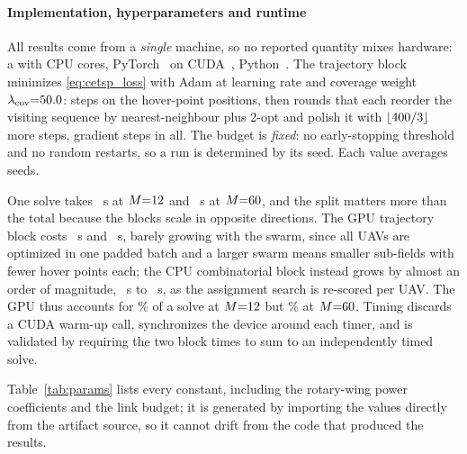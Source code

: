 \paragraph*{Implementation, hyperparameters and runtime}
All results come from a \emph{single} machine, so no reported quantity mixes
hardware: a \rEnvGpu{} with \rEnvCores{} CPU cores, PyTorch~\rEnvTorch{} on
CUDA~\rEnvCuda{}, Python~\rEnvPython{}. The trajectory block minimizes
\eqref{eq:cetsp_loss} with Adam at learning rate \rHpLr{} and coverage weight
$\lambda_{\mathrm{cov}}{=}50.0{}$: \rHpIters{} steps on the hover-point
positions, then \rHpReorder{} rounds that each reorder the visiting sequence by
nearest-neighbour plus 2-opt and polish it with $\lfloor400{}/3\rfloor$ more
steps, \rHpSteps{} gradient steps in all. The budget is \emph{fixed}: no
early-stopping threshold and no random restarts, so a run is determined by its seed.
Each value averages \rRtSeeds{} seeds.

One solve takes \rRtLoTotal{}~s at $M{=}12{}$ and \rRtHiTotal{}~s at
$M{=}60{}$, and the split matters more than the total because the blocks scale
in opposite directions. The GPU trajectory block costs \rRtLoTraj{}~s and
\rRtHiTraj{}~s, barely growing with the swarm, since all UAVs are optimized in one
padded batch and a larger swarm means smaller sub-fields with fewer hover points
each; the CPU combinatorial block instead grows by almost an order of magnitude,
\rRtLoComb{}~s to \rRtHiComb{}~s, as the assignment search is re-scored per UAV. The
GPU thus accounts for \rRtLoGpuShare{}\% of a solve at $M{=}12{}$ but
\rRtHiGpuShare{}\% at $M{=}60{}$. Timing discards a CUDA warm-up call, synchronizes the device around each timer, and
is validated by requiring the two block times to sum to an independently timed solve.

Table~\ref{tab:params} lists every constant, including the rotary-wing power
coefficients and the link budget; it is generated by importing the values directly from
the artifact source, so it cannot drift from the code that produced the results.



